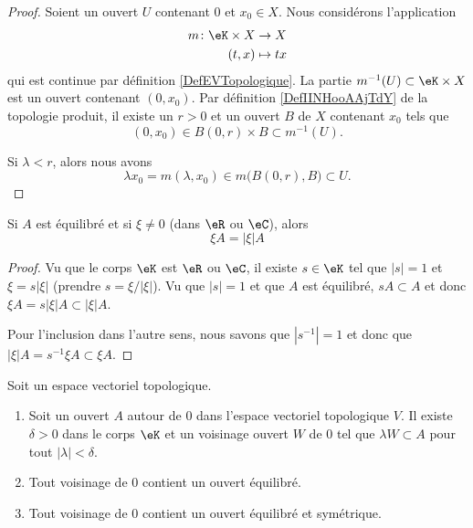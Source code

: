 \begin{proof}
	Soient un ouvert \( U\) contenant \( 0\) et \( x_0\in X\). Nous considérons l'application
	\begin{equation}
		\begin{aligned}
			m\colon \eK\times X & \to X      \\
			(t,x)               & \mapsto tx
		\end{aligned}
	\end{equation}
	qui est continue par définition \ref{DefEVTopologique}. La partie \( m^{-1}(U)\subset \eK\times X\) est un ouvert contenant \( (0,x_0)\). Par définition \ref{DefIINHooAAjTdY} de la topologie produit, il existe un \( r>0\) et un ouvert \( B\) de \( X\) contenant \( x_0\) tels que
	\begin{equation}
		(0,x_0)\in B(0,r)\times B\subset m^{-1}(U).
	\end{equation}

	Si \( \lambda< r\), alors nous avons
	\begin{equation}
		\lambda x_0=m(\lambda, x_0)\in m\big( B(0,r),B \big)\subset U.
	\end{equation}
\end{proof}

\begin{lemma}		\label{LEMooKBRIooUAAPXV}
	Si \( A\) est équilibré et si \( \xi\neq 0\) (dans \( \eR\) ou \( \eC\)), alors
	\begin{equation}
		\xi A=| \xi |A
	\end{equation}
\end{lemma}

\begin{proof}
	Vu que le corps \( \eK\) est \( \eR\) ou \( \eC\), il existe \( s\in \eK\) tel que \( | s |=1\) et \( \xi=s| \xi |\) (prendre \( s=\xi/| \xi |\)). Vu que \( | s |=1\) et que \( A\) est équilibré, \( sA\subset A\) et donc \( \xi A=s| \xi |A\subset | \xi |A\).

	Pour l'inclusion dans l'autre sens, nous savons que \( | s^{-1} |=1\) et donc que \( | \xi |A=s^{-1}\xi A\subset \xi A\).
\end{proof}

\begin{lemma}     \label{LEMooYSWXooNqAcOQ}
	Soit un espace vectoriel topologique.
	\begin{enumerate}
		\item       \label{ITEMooSWWQooTreWIE}
		      Soit un ouvert \( A\) autour de \( 0\) dans l'espace vectoriel topologique \( V\). Il existe \( \delta>0\) dans le corps \( \eK\) et un voisinage ouvert \(W\) de \( 0\) tel que \( \lambda W\subset A\) pour tout \( | \lambda |<\delta\).
		\item       \label{ITEMooXZNHooGVplpu}
		      Tout voisinage de \( 0\) contient un ouvert équilibré.
		\item       \label{ITEMooRLVSooGihcLc}
		      Tout voisinage de \( 0\) contient un ouvert équilibré et symétrique.
	\end{enumerate}
\end{lemma}

